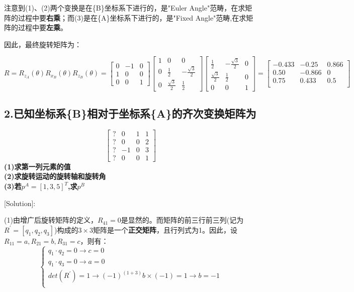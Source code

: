 \documentclass{ctexart}
\begin{document}
注意到(1)、(2)两个变换是在\{B\}坐标系下进行的，是"Euler Angle"范畴，在求矩阵的过程中要\textbf{右乘}；而(3)是在\{A\}坐标系下进行的，是"Fixed Angle"范畴,在求矩阵的过程中要\textbf{左乘}。

因此，最终旋转矩阵为：

\begin{equation*}
	R = R_{z_A}(\theta)R_{x_B}(\theta)R_{z_B}(\theta) = \begin{bmatrix}
		0 & -1 & 0 \\
		1 & 0 & 0 \\
		0 & 0 & 1
	\end{bmatrix}\begin{bmatrix}
		1 & 0 & 0 \\
		0 & \frac{1}{2} & -\frac{\sqrt{3}}{2} \\
		0 & \frac{\sqrt{3}}{2} & \frac{1}{2}
	\end{bmatrix}\begin{bmatrix}
		\frac{1}{2} & -\frac{\sqrt{3}}{2} & 0 \\
		\frac{\sqrt{3}}{2} & \frac{1}{2} & 0 \\
		0 & 0 & 1
	\end{bmatrix}=
	\begin{bmatrix}
		-0.433 & -0.25 & 0.866 \\
		0.50 & -0.866 & 0 \\
		0.75 & 0.433 & 0.5\\
	\end{bmatrix}
\end{equation*}

\subsection*{2.已知坐标系\{B\}相对于坐标系\{A\}的齐次变换矩阵为}

$$
\begin{bmatrix}
	? & 0 & 1 & 1 \\
	? & 0 & 0 & 2 \\
	? & -1 & 0 & 3 \\
	? & 0 & 0 & 1
\end{bmatrix}
$$
\textbf{(1)求第一列元素的值\\(2)求旋转运动的旋转轴和旋转角\\(3)若$p^A=[1,3,5]^T$,求$p^B$} 

[Solution]:\par

(1)由增广后旋转矩阵的定义，$R_{41}=0$是显然的。而矩阵的前三行前三列(记为$R^\prime = [q_1,q_2,q_3]$)构成的$3\times 3$矩阵是一个\textbf{正交矩阵}，且行列式为1。因此，设$R_{11}=a,R_{21}=b,R_{31}=c$，则有：
\begin{equation}
	\begin{cases}
		q_1 \cdot q_2 = 0 \rightarrow c = 0\\
		q_1 \cdot q_3 = 0 \rightarrow a = 0\\
		det(R^\prime) = 1 \rightarrow (-1)^{(1+3)}b\times(-1)=1 \rightarrow b = -1\\
	\end{cases}
\end{equation}
\end{document}
